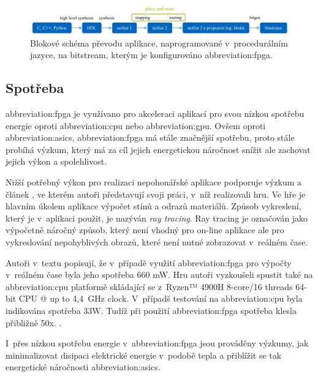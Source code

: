 \documentclass[a4paper, twoside, 11pt]{article}
\newcommand{\fbar}{\FloatBarrier}
\begin{document}
			
			\begin{figure}[htbp!]
				\centering
					\includegraphics[width=1\textwidth]{src/pdf/fpga-hls-to-bitstream-flow-chart.pdf} 
					\caption{Blokové schéma převodu aplikace, naprogramované v~procedurálním jazyce, na bitstream, kterým je konfigurováno \gls{abbreviation:fpga}.}
					\label{fig:fpga-hls-to-bitstream-flow-chart}
			\end{figure}

		\fbar
		\subsection{Spotřeba}
		\gls{abbreviation:fpga} je využívano pro akceleraci aplikací pro svou nízkou spotřebu energie oproti \gls{abbreviation:cpu} nebo \gls{abbreviation:gpu}. Ovšem oproti \gls{abbreviation:asics}, \gls{abbreviation:fpga} má stále značnější spotřebu, proto stále probíhá výzkum, který má za cíl jejich energetickou náročnost snížit ale zachovat jejich výkon a spolehlivost.\par
			Nižší potřebný výkon pro realizaci nepohonářské aplikace podporuje výzkum a článek \cite{rovere-sphery-vs-shapes}, ve kterém autoři představují svoji práci, v~níž realizovali hru. Ve hře je hlavním úkolem aplikace výpočet stínů a odrazů materiálů. Způsob vykreslení, který je v~aplikaci použit, je nazýván \textit{ray tracing}. Ray tracing je označován jako výpočetně náročný způsob, který není vhodný pro on-line aplikace ale pro vykreslování nepohyblivých obrazů, které není nutné zobrazovat v~reálném čase. \cite{wikipedia-ray-tracing}\par
			Autoři v~textu popisují, že v~případě využití \gls{abbreviation:fpga} pro výpočty v~reálném čase byla jeho spotřeba 660 mW. Hru autoři vyzkoušeli spustit také na \gls{abbreviation:cpu} platformě skládající se z~Ryzen™️ 4900H 8-core/16 threads 64-bit CPU @ up to 4,4~GHz clock. V~případš testování na \gls{abbreviation:cpu} byla indikována spotřeba 33W. Tudíž při použití \gls{abbreviation:fpga} spotřeba klesla přibližně 50x. \cite{rovere-sphery-vs-shapes}.\par
			I~přes nízkou spotřebu energie v~\gls{abbreviation:fpga} jsou prováděny výzkumy, jak minimalizovat disipaci elektrické energie v~podobě tepla a přiblížit se tak energetické náročnosti \gls{abbreviation:asics}.\par
\end{document}
